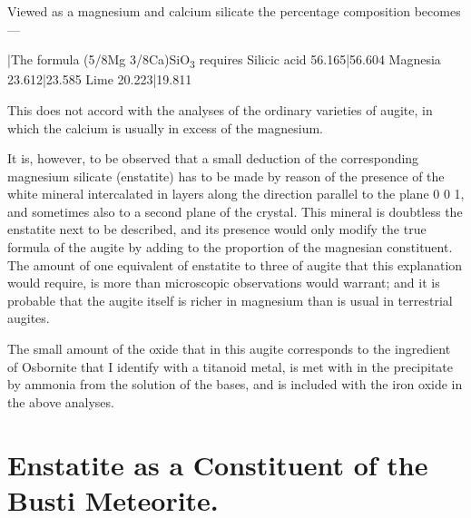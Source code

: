 \documentclass[a4paper, 12pt, oneside]{article}
\begin{document}
Viewed as a magnesium and calcium silicate the percentage composition becomes ---

|The formula (5/8Mg 3/8Ca)SiO\textsubscript{3} requires  
Silicic acid 56.165|56.604  
Magnesia 23.612|23.585  
Lime 20.223|19.811  

This does not accord with the analyses of the ordinary varieties of augite, in which the calcium is usually in excess of the magnesium.

It is, however, to be observed that a small deduction of the corresponding magnesium silicate (enstatite) has to be made by reason of the presence of the white mineral intercalated in layers along the direction parallel to the plane 0 0 1, and sometimes also to a second plane of the crystal. This mineral is doubtless the enstatite next to be described, and its presence would only modify the true formula of the augite by adding to the proportion of the magnesian constituent. The amount of one equivalent of enstatite to three of augite that this explanation would require, is more than microscopic observations would warrant; and it is probable that the augite itself is richer in magnesium than is usual in terrestrial augites.

The small amount of the oxide that in this augite corresponds to the ingredient of Osbornite that I identify with a titanoid metal, is met with in the precipitate by ammonia from the solution of the bases, and is included with the iron oxide in the above analyses.
\clearpage
\section{Enstatite as a Constituent of the Busti Meteorite.}
\end{document}
